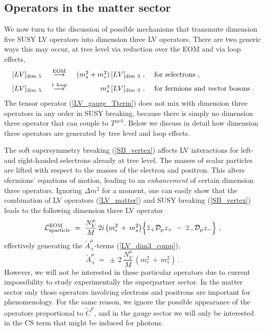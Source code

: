 \documentclass[12pt]{revtex4}
\begin{document}
\subsection{Operators in the matter sector}


We now turn to the discussion of possible mechanisms that transmute
dimension five SUSY LV operators 
into dimension three LV operators. There are two generic ways this 
may occur, at tree level via reduction over the EOM and via loop
effects,   
\begin{equation}
\begin{array}{l c r l} 
\, [LV]_{\rm dim~5} & ~\stackrel{\mathrm {EOM}}{\longrightarrow}~ &
  (m_{s}^2 + m_e^2)\, [LV]_{\rm dim~3}~,~ &{\rm for~selectrons}~, 
\\[1ex] \,
[LV]_{\rm dim~5} &~ \stackrel{\mathrm {1\ loop}}{\longrightarrow}~ &
  m_{s}^2\, [LV]_{\rm dim~3}~,~ & {\rm for~fermions ~and ~vector~bosons}
~.
\end{array}
\nonumber
\end{equation}
%
The tensor operator (\ref{LV_gauge_Tterm}) does not mix with dimension
three operators in any order in SUSY breaking, because there is simply
no dimension three operator that can couple to
$T^{\mu\nu\lambda}$. Below we discuss in detail how dimension
three operators are generated by tree level and loop effects. 


The soft supersymmetry breaking (\ref{SB_vertex}) affects LV
interactions for left- and right-handed selectrons already at tree
level. The masses of scalar particles are lifted with respect to the
masses of the electron and positron. This alters sfermions' equations
of motion, leading to an {\em enhancement} of certain dimension three
operators. Ignoring $\Delta m^2$ for a moment, one can easily show
that the combination of LV operators (\ref{LV_matter}) and SUSY
breaking (\ref{SB_vertex}) leads to the following dimension three LV
operator 
%
\begin{equation}
  \mathcal{L}_{\rm sparticle}^{\rm EOM} ~=~  
\frac{N_V^\mu}{M}\, 2 i\, 
\big(
m_e^2 \,+\,  m_s^2
\big)
\Bigl\{ 
\overline{z}_+ \mathcal{D}_\mu z_+ 
~-~
\overline{z}_- \mathcal{D}_\mu z_- 
\Bigr\}~,  
\end{equation}
%
effectively generating the $ \widetilde{A}^\mu_\pm $-terms
%
(\ref{LV_dim3_comp}), 
 \begin{equation}
\widetilde{A}_\pm^\mu ~=~  
\pm\, 2\, \frac{N_V^\mu}{ M }   \, 
(m_e^2 \, +\,  m_s^2)~.
\end{equation}
%
However, we will not be interested in these particular operators due
to current impossibility to study experimentally  the superpartner
sector. In the matter sector only those operators involving electrons
and positrons are important for phenomenology.  
For the same reason, we ignore the possible appearance of the
operators proportional to $ \widetilde{C}^\mu $, and in the gauge
sector we will only be interested in the CS term that might
be induced for photons. 
\end{document}
